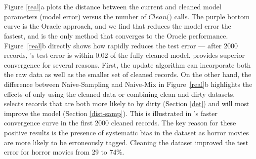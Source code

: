 Figure \ref{real}a plots the distance between the current and cleaned model parameters (model error) versus the number of $Clean(\dot)$ calls.  
The purple bottom curve is the Oracle approach, and we find that \sys reduces the model error the fastest, and is the only method that converges to the Oracle performance.
Figure~\ref{real}b directly shows how \sys rapidly reduces the test error --- after 2000 records, \sys's test error is within 0.02 of the fully cleaned model.
\sys provides superior convergence for several reasons.
First, the update algorithm can incorporate both the raw data as well as the smaller set of cleaned records.
On the other hand, the difference between Naive-Sampling and Naive-Mix in Figure~\ref{real}b highlights the effects of only using the cleaned data or combining clean and dirty datasets.
\sys selects records that are both more likely to by dirty (Section \ref{det}) and will most improve the model (Section \ref{dist-samp}).
This is illustrated in \sys's faster convergence curve in the first 2000 cleaned records.
The key reason for these positive results is the presence of systematic bias in the dataset as horror movies are more likely to be erroneously tagged.
Cleaning the dataset improved the test error for horror movies from 29 to 74\%.



